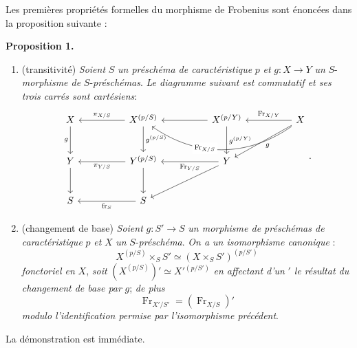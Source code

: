 \documentclass[11pt]{article}
\newenvironment{statement}[1]{\par\medskip\noindent\textbf{#1.}\ }{\par\medskip}
\providecommand{\fr}{\operatorname{fr}}
\providecommand{\Fr}{\operatorname{Fr}}
\providecommand{\Fr}{\operatorname{Fr}}
\providecommand{\fr}{\operatorname{fr}}
\begin{document}
Les premières propriétés formelles du morphisme de Frobenius sont énoncées dans la proposition suivante :

\begin{statement}{Proposition 1}
\begin{enumerate}[label=\alph*)]
\item
(transitivité) \emph{Soient} $S$ \emph{un préschéma de caractéristique} $p$ \emph{et} $g:X\to Y$ \emph{un} $S$-\emph{morphisme de} $S$-\emph{préschémas}. \emph{Le diagramme suivant est commutatif et ses trois carrés sont cartésiens}:
\[
\begin{tikzcd}[column sep=huge,row sep=large]
X \arrow[d,"g"'] & X^{(p/S)} \arrow[l,"\pi_{X/S}"'] \arrow[d,"g^{(p/S)}"] & X^{(p/Y)} \arrow[l] \arrow[d,"g^{(p/Y)}"] & X \arrow[l,"\Fr_{X/Y}"'] \arrow[ll,bend left=35,"\Fr_{X/S}"{description,pos=0.62}] \arrow[dl,"g"] \\
Y \arrow[d] & Y^{(p/S)} \arrow[l,"\pi_{Y/S}"] \arrow[d] & Y \arrow[l,"\Fr_{Y/S}"] \arrow[dl] & {} \\
S & S \arrow[l,"\fr_S"] & {} & {}
\end{tikzcd}.
\]

\item (changement de base) \emph{Soient} $g:S'\to S$ \emph{un morphisme de préschémas de caractéristique} $p$ \emph{et} $X$ \emph{un} $S$-\emph{préschéma}. \emph{On a un isomorphisme canonique} :
\[
X^{(p/S)}\times_S S'\simeq (X\times_S S')^{(p/S')}
\]
\emph{fonctoriel en} $X$, \emph{soit} $(X^{(p/S)})'\simeq X'{}^{(p/S')}$ \emph{en affectant d'un} $'$ \emph{le résultat du changement de base par} $g$; \emph{de plus}
\[
\Fr_{X'/S'}=(\Fr_{X/S})'
\]
\emph{modulo l'identification permise par l'isomorphisme précédent}.
\end{enumerate}
\end{statement}

La démonstration est immédiate.
\end{document}
